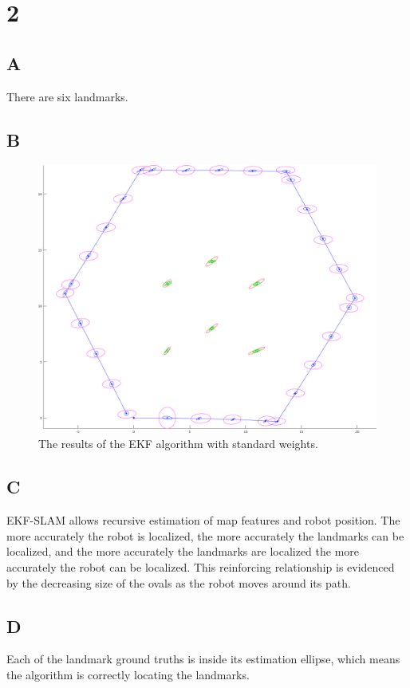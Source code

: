\documentclass[letterpaper]{article}
\begin{document}
\section*{2}
\subsection*{A}
There are six landmarks.
\subsection*{B}
\begin{figure}[H]
    \includegraphics[width=\textwidth]{EKF_slam/standard_result.png}
    \caption{The results of the EKF algorithm with standard weights.}
\end{figure}
\subsection*{C}
EKF-SLAM allows recursive estimation of map features and robot position. The more accurately the 
robot is localized, the more accurately the landmarks can be localized, and the more accurately the landmarks 
are localized the more accurately the robot can be localized. This reinforcing relationship is evidenced by the 
decreasing size of the ovals as the robot moves around its path.
\subsection*{D}
Each of the landmark ground truths is inside its estimation ellipse, which means the algorithm is correctly locating 
the landmarks. 
\end{document}
